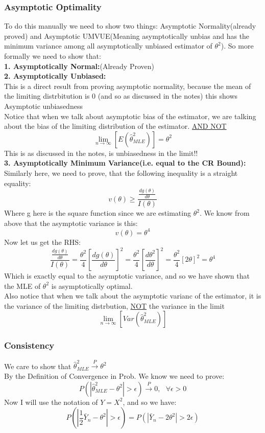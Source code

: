 \documentclass[12pt]{article}
\begin{document}
\subsubsection*{Asymptotic Optimality}
To do this manually we need to show two things: Asymptotic Normality(already proved) and Asymptotic UMVUE(Meaning asymptotically unbias and has the minimum variance among all asymptotically unbiased estimator of $\theta^2$). So more formally we need to show that:\\
\textbf{1. Asymptotically Normal:}(Already Proven)\\
\textbf{2. Asymptotically Unbiased:}\\
This is a direct result from proving asymptotic normality, because the mean of the limiting distrbitution is 0 (and so as discussed in the notes) this shows Asymptotic unbiasedness\\
Notice that when we talk about asymptotic bias of the estimator, we are talking about the bias of the limiting distribution of the estimator. \underline{AND NOT}
\[
\lim_{n\to \infty}[E(\hat{\theta}^2_{MLE})] = \theta^2
\]
This is as discussed in the notes, is unbiasedness in the limit!! \\
\textbf{3. Asymptotically Minimum Variance(i.e. equal to the CR Bound):}\\
Similarly here, we need to prove, that the following inequality is a straight equality: 
\[
v(\theta)\geq \frac{\frac{dg(\theta)}{d\theta}}{I(\theta)}
\]
Where g here is the square function since we are estimating $\theta^2$. We know from above that the asymptotic variance is this:
\[
v(\theta) = \theta^4
\]
Now let us get the RHS:
\[
  \frac{\frac{dg(\theta)}{d\theta}}{I(\theta)} = \frac{\theta^2}{4}[\frac{dg(\theta)}{d\theta}]^2=\frac{\theta^2}{4}[\frac{d\theta^2}{d\theta}]^2 = \frac{\theta^2}{4}[2\theta]^2 = \theta^4
\]
Which is exactly equal to the asymptotic variance, and so we have shown that the MLE of $\theta^2$ is asymptotically optimal.\\
Also notice that when we talk about the asymptotic varianc of the estimator, it is the variance of the limiting distrbution, \underline{NOT} the variance in the limit 
\[ 
\lim_{n\to \infty}[Var(\hat{\theta}^2_{MLE})]
\]
\subsubsection*{Consistency}
We care to show that $\hat{\theta}^2_{MLE} \xrightarrow{P}\theta^2$ \\
By the Definition of Convergence in Prob. We know we need to prove:
\[
  P(|\hat{\theta}^2_{MLE} - \theta^2| > \epsilon) \xrightarrow{P} 0, \ \ \ \forall \epsilon > 0
\]
Now I will use the notation of $Y=X^2$, and so we have:
\[
  P(|\frac{1}{2}\bar{Y}_n - \theta^2| > \epsilon) = P(|\bar{Y}_n - 2\theta^2| > 2\epsilon)
\]
\end{document}
